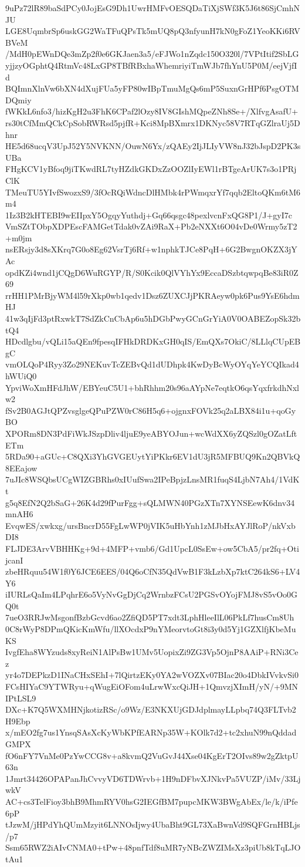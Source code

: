 9uPz72lR89baSdPCy0JojEsG9Dh1UwrHMFvOESQDaTiXjSWf3K5J6t86SjCmhNJU
LGE8UqmbrSp6uskGG2WaTFuQPsTk5mUQ8pQ3nfyunH7kN0gFoZ1YeoKKi6RVBVeM
/MdH0pEWnDQe3mZp2f0e6GKJaen3a5/eFJWo1nZqdc150O320l/7VPtItif2SbLG
yjjzyOGphtQ4RtmVc48LxGP8TBfRBxhaWhemriyiTmWJb7fhYnU5P0M/eejVjfId
BQImnXlnVw6bXN4dXujFUa5yFP80wIBpTmuMgQs6mP5SuxnGrHPf6PsgOTMDQmiy
fWKkL6nfo3/hizKgH2u3FhK6CPaf2lOzy8IV8GIshMQpeZNh8Se+/XlfvgAsafU+
rs30tCfMmQCkCpSobRWRsd5pjfR+Kci8MpBXmrx1DKNyc58V7RTqGZlraUj5Dhnr
HE5d68ucqV3UpJ52Y5NVKNN/OuwN6Yx/zQAEy2IjJLIyVW8nJ32bJspD2PK3sUBa
FHgKCV1yBfoq9jiTKwdRL7tyHZdkGKDxZzOOZlIyEWl1rBTgeArUK7s3o1PRjClK
TMeuTU5YIvfSwozxS9/3fOcRQiWdncDlHMbk4rPWmqxrYf7qqb2EltoQKm6tM6m4
1Iz3B2kHTEBI9wEIIpxY5OgqyYuthdj+Gq66qsgc48pexlvcnFxQG8P1/J+gyI7c
VmSZtTObpXDPEscFAMGetTdak0vZAi9RaX+Pb2eNXXt6O04vDe0Wrmy5zT2+m0jm
nsERsjy3d8sXKrq7G0o8Eg62VsrTj6Rf+w1nphkTJCe8PqH+6G2BwgnOKZX3jYAc
opdKZi4wnd1jCQgD6WuRGYP/R/S0Kcik0QlVYhYx9EccaDSzbtqwpqBe83iR0Z69
rrHH1PMrBjyWM4l59rXkp0wb1qedv1Dsz6ZUXCJjPKRAeyw0pk6Pus9YsE6hdmHJ
41w3qIjFd3ptRxwkT7SdZkCnCbAp6u5hDGbPwyGCnGrYiA0V0OABEZopSk32btQ4
HDcdlgbu/vQLi15aQEn9fpesqIFHkDRDKxGH0qIS/EmQXs7OkiC/8LLlqCUpEBgC
vmOLQoP4Ryy3Zo29NEKuvTcZEBvQd1dUDhpk4KwDyBcWyOYqYeYCQIkad4hWUiQ0
YpviWoXmHFdJhW/EBYeuC5U1+bhRhhm20s96aAYpNe7eqtkO6qsYqxfrkdhNxlw2
fSv2B0AGJtQPZvsglgeQPuPZW0rC86H5q6+ojgnxFOVk25q2aLBX84i1u+qoGyBO
XPORm8DN3PdFiWkJSzpDliv4ljuE9yeABYOJun+wcWdXX6yZQSzl0gOZatLftETm
5RDa90+aGUc+C8QXi3YhGVGEUytYiPKkr6EV1dU3jR5MFBUQ9Kn2QBVkQ8EEajow
7uJIc8WSQbsUCgWIZGBRhs0xIUufSwa2IPeBpjzLnsMR1fuqS4LjbN7Ah4/1VdKt
g5q8EfN2Q2bSaG+26K4d29fPurFgg+sQLMWN40PGzXTn7XYNSEewK6dnv34mnAH6
EvqwES/xwkxg/ursBncrD55FgLwWP0jVIK5uHbYnh1zMJbHxAYJlRoP/nkVxbDI8
FLJDE3ArvVBHHKg+9d+4MFP+vmb6/Gd1UpcL0SsEw+ow5CbA5/pr2fq+OtijcanI
zbeHRquu54W1f0Y6JCE6EES/04Q6oCfN35QdVwB1F3kLzbXp7ktC264kS6+LV4Y6
iIURLsQaIm4LPqhrE6o5VyNvGgDjCq2WrnbzFCsU2PGSvOYojFMJ8vS5vOo0GQ0t
7ueO3RRJwMsgonfBzbGcvd6ao2ZfiQD5PT7xdt3LphHleeIlL06PkLf7husCm8Uh
0C8rWyP8DPmQKicKmWfu/llXOcdxP9nYMeorvtoGt8i3y0d5Yj1GZXlfjKbeMuKS
IvgfEha8WYzuds8xyReiN1AlPsBw1UMv5UopixZi9ZG3Vp5OjnP8AAiP+RNi3Cez
yr4o7DEPkzD1INaCHxSEhI+7lQirtzEKy0YA2wVOZXv07BIac20o4DbkIVvkvSi0
FCsHIYaC9YTWRyu+qWugEiOFom4uLrwWxcQiJH+1QmvzjXImH/yN/+9MNIPtLSL9
DXc+K7Q5WXMHNjkotizRSc/o9Wz/E3NKXUjGDJdplmayLLpbq74Q3FLTvb2H9Ebp
x/mEO2fg7us1YnsqSAsXcKyWbKPfEARNp35W+KOlk7d2+tc2xhuN99nQddadGMPX
fO6nFY7VnMe0PzYwCCG8v+a8kvmQ2VuGvJ44Xse04KgErT2OIvs89w2gZktpU63n
1Jmrt34426OPAPanJhCvvyVD6TDWrvb+1H9nDFbvXJNkvPa5VUZP/iMv/33LjwkV
AC+cs3TelFioy3bhB9MhmRYV0hsG2IEGfBM7pupcMKW3BWgAbEx/le/k/iPfe6pP
tJzwM/jHPdYhQUmMzyit6LNNOsIjwy4UbaBht9GL73XaBwnVd9SQFGrnHBLjs/p7
Ssm65RWZ2iAIvCNMA0+tPw+48pnfTdf8uMR7yNBcZWZIMsXz3piUb8kTqLJOtAu1
